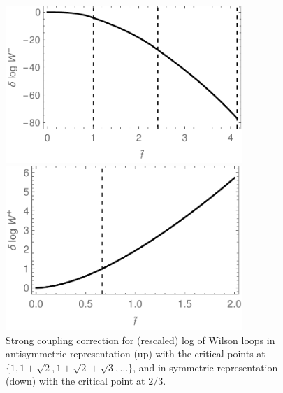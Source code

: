 \begin{figure}[t]
\begin{center}
 \centerline{ \includegraphics[width=0.8\textwidth]{Images/AntisymBlack.pdf} }
 \centerline{ \includegraphics[width=0.8\textwidth]{Images/SymBlack.pdf} }
\end{center}
\caption{\label{fig:plotsCorrection} Strong coupling correction for (rescaled) log of Wilson loops in 
antisymmetric representation (up) with the critical points at $\{1, 1+\sqrt{2}, 1+\sqrt{2}+\sqrt{3},\ldots\}$,
and in symmetric representation (down) with the critical point at $2/3$.}
\end{figure}

